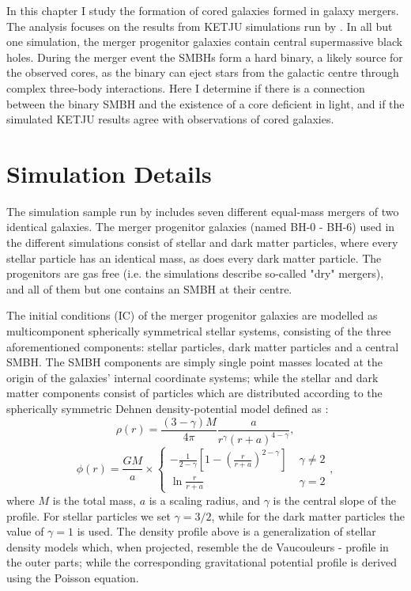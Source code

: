 \documentclass[english, oneside]{HYgradu}
\begin{document}
In this chapter I study the formation of cored galaxies formed in galaxy mergers. The analysis focuses on the results from KETJU simulations run by \cite{Rantala2018}. In all but one simulation, the merger progenitor galaxies contain central supermassive black holes. During the merger event the SMBHs form a hard binary, a likely source for the observed cores, as the binary can eject stars from the galactic centre through complex three-body interactions. Here I determine if there is a connection between the binary SMBH and the existence of a core deficient in light, and if the simulated KETJU results agree with observations of cored galaxies.


\section{Simulation Details}

The simulation sample run by \cite{Rantala2018} includes seven different equal-mass mergers of two identical galaxies. The merger progenitor galaxies (named BH-0 - BH-6) used in the different simulations consist of stellar and dark matter particles, where every stellar particle has an identical mass, as does every dark matter particle. The progenitors are gas free (i.e. the simulations describe so-called "dry" mergers), and all of them but one contains an SMBH at their centre.

The initial conditions (IC) of the merger progenitor galaxies are modelled as multicomponent spherically symmetrical stellar systems, consisting of the three aforementioned components: stellar particles, dark matter particles and a central SMBH. The SMBH components are simply single point masses located at the origin of the galaxies' internal coordinate systems; while the stellar and dark matter components consist of particles which are distributed according to the spherically symmetric Dehnen density-potential model defined as \citep{Dehnen1993}:
\begin{equation}
\rho(r) = \frac{(3-\gamma)M}{4\pi} \frac{a}{r^\gamma (r+a)^{4-\gamma}}, \label{eq:dehnen_density}
\end{equation}
\begin{equation}
\phi(r) = \frac{GM}{a} \times 
\begin{cases}
	-\frac{1}{2-\gamma} \left[ 1 - \left( \frac{r}{r+a} \right)^{2-\gamma} \right] & \; \gamma \neq 2 \\
	\ln \frac{r}{r+a}	 & \; \gamma = 2
\end{cases},
\label{eq:dehnen_potential}
\end{equation}
where $M$ is the total mass, $a$ is a scaling radius, and $\gamma$ is the central slope of the profile. For stellar particles we set $\gamma = 3/2$, while for the dark matter particles the value of $\gamma = 1$ is used. The density profile above is a generalization of stellar density models which, when projected, resemble the de Vaucouleurs - profile \citep[$\log(\mu) \propto R^{1/4}$;][]{deVaucouleurs1948} in the outer parts; while the corresponding gravitational potential profile is derived using the Poisson equation. 
\end{document}
